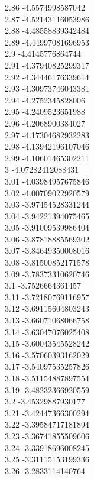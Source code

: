 {2.86	-4.5574998587042\\
2.87	-4.52143116053986\\
2.88	-4.48558839342484\\
2.89	-4.44997081696953\\
2.9	-4.4145776864744\\
2.91	-4.37940825299317\\
2.92	-4.34446176339614\\
2.93	-4.30973746043381\\
2.94	-4.2752345828006\\
2.95	-4.2409523651988\\
2.96	-4.2068900384027\\
2.97	-4.17304682932283\\
2.98	-4.13942196107046\\
2.99	-4.10601465302211\\
3	-4.07282412088431\\
3.01	-4.03984957675846\\
3.02	-4.00709022920579\\
3.03	-3.97454528331244\\
3.04	-3.94221394075465\\
3.05	-3.91009539986404\\
3.06	-3.87818885569302\\
3.07	-3.84649350008016\\
3.08	-3.81500852171578\\
3.09	-3.78373310620746\\
3.1	-3.7526664361457\\
3.11	-3.72180769116957\\
3.12	-3.69115604803243\\
3.13	-3.66071068066758\\
3.14	-3.63047076025408\\
3.15	-3.60043545528242\\
3.16	-3.57060393162029\\
3.17	-3.54097535257826\\
3.18	-3.51154887897554\\
3.19	-3.48232366920559\\
3.2	-3.45329887930177\\
3.21	-3.42447366300294\\
3.22	-3.39584717181894\\
3.23	-3.36741855509606\\
3.24	-3.33918696008245\\
3.25	-3.31115153199336\\
3.26	-3.2833114140764\\
}

